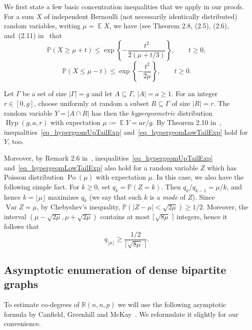 \documentclass[12pt,reqno]{amsart}
\newcommand{\E}{\operatorname{\mathbb{E}}}
\newcommand{\Var} {\operatorname {Var}}
\newcommand{\Prob} {\mathbb {P}}
\newcommand{\prob}[1]{\Prob\left(#1\right)}
\newcommand{\R} {\mathbb R}
\newcommand{\Po}{\operatorname{Po}}
\newcommand{\Hyp}{\operatorname{Hyp}}
\theoremstyle{definition}
\begin{document}
We first state a few basic concentration inequalities that we  apply in our proofs.
For a sum $X $ of independent Bernoulli (not necessarily identically distributed) random variables, writing $\mu = \E X$, we have (see Theorem 2.8, (2.5), (2.6), and~(2.11) in~\cite{JLR} that
	\begin{equation}
		\label{eq_hypergeomUpTailExp}
		\prob{X \ge \mu + t} \le \exp \left\{ - \frac{t^2}{2\left( \mu + t/3 \right)} \right\}, \qquad t \ge 0,
	\end{equation}
\begin{equation}
		\label{eq_hypergeomLowTailExp}
		\prob{X \le \mu - t} \le \exp \left\{ - \frac{t^2}{2\mu} \right\}, \qquad t \ge 0.
	\end{equation}
	

	Let $\Gamma$ be a set of size $|\Gamma|=g$ and let  $A \subseteq \Gamma$,  $|A|=a \ge1$. For an integer $r \in [0,g]$, choose uniformly at random a subset $R \subseteq \Gamma$ of size $|R|=r$. The random variable $Y = |A \cap R|$ has then the \emph{hypergeometric} distribution $\Hyp(g, a, r)$ with expectation $\mu := \E Y = ar/g$.
By Theorem 2.10 in~\cite{JLR}, inequalities~\eqref{eq_hypergeomUpTailExp} and~\eqref{eq_hypergeomLowTailExp} hold for $Y$, too.

Moreover, by Remark 2.6 in~\cite{JLR}, inequalities~\eqref{eq_hypergeomUpTailExp} and~\eqref{eq_hypergeomLowTailExp} also hold for a random variable $Z$ which has Poisson distribution $\Po(\mu)$ with expectation $\mu$.
In this case, we also have the following simple fact.
For $k\ge0$, set $q_k=\prob{Z=k}$. Then $q_k/q_{k-1}=\mu/k$, and hence $k = \lfloor\mu\rfloor$ maximizes $q_k$ (we say that such $k$ is a \emph{mode} of $Z$). Since $\Var Z = \mu$, by Chebyshev's inequality, $\prob{|Z-\mu|<\sqrt{2\mu}}\ge1/2$. Moreover, the interval $(\mu - \sqrt{2 \mu}, \mu + \sqrt{2 \mu})$ contains at most $\lceil \sqrt{8\mu}\:\rceil$ integers, hence it follows that
\begin{equation}
  \label{eq_largestatom}
  q_{\lfloor \mu \rfloor} \ge \frac{1/2}{\lceil \sqrt{8\mu}\: \rceil}.
\end{equation}



\subsection{Asymptotic enumeration of dense bipartite graphs}
\label{ss_count}

To estimate co-degrees of $\R(n,n,p)$ we will use the following asymptotic formula by Canfield, Greenhill and McKay~\cite{CGM}. We reformulate it slightly for our convenience.
\end{document}

